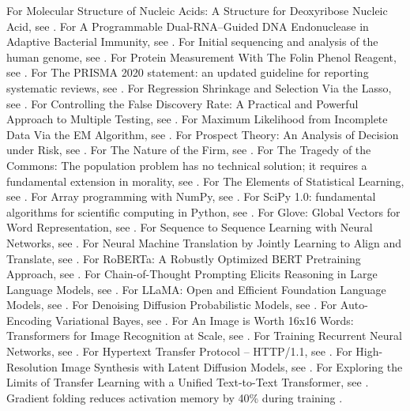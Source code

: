 \documentclass{article}
\begin{document}
For Molecular Structure of Nucleic Acids: A Structure for Deoxyribose Nucleic Acid, see \citet{watson1953molecular}.
For A Programmable Dual-RNA–Guided DNA Endonuclease in Adaptive Bacterial Immunity, see \citet{jinek2012programmable}.
For Initial sequencing and analysis of the human genome, see \citet{lander2001initial}.
For Protein Measurement With The Folin Phenol Reagent, see \citet{lowry1951protein}.
For The PRISMA 2020 statement: an updated guideline for reporting systematic reviews, see \citet{page2021prisma}.
For Regression Shrinkage and Selection Via the Lasso, see \citet{tibshirani1996regression}.
For Controlling the False Discovery Rate: A Practical and Powerful Approach to Multiple Testing, see \citet{benjamini1995controlling}.
For Maximum Likelihood from Incomplete Data Via the EM Algorithm, see \citet{dempster1977maximum}.
For Prospect Theory: An Analysis of Decision under Risk, see \citet{kahneman1979prospect}.
For The Nature of the Firm, see \citet{coase1937nature}.
For The Tragedy of the Commons: The population problem has no technical solution; it requires a fundamental extension in morality, see \citet{hardin1968tragedy}.
For The Elements of Statistical Learning, see \citet{hastie2009elements}.
For Array programming with NumPy, see \citet{harris2020array}.
For SciPy 1.0: fundamental algorithms for scientific computing in Python, see \citet{virtanen2020scipy}.
For Glove: Global Vectors for Word Representation, see \citet{pennington2014glove}.
For Sequence to Sequence Learning with Neural Networks, see \citet{sutskever2014sequence}.
For Neural Machine Translation by Jointly Learning to Align and Translate, see \citet{bahdanau2015neural}.
For RoBERTa: A Robustly Optimized BERT Pretraining Approach, see \citet{liu2019roberta}.
For Chain-of-Thought Prompting Elicits Reasoning in Large Language Models, see \citet{wei2022chain}.
For LLaMA: Open and Efficient Foundation Language Models, see \citet{touvron2023llama}.
For Denoising Diffusion Probabilistic Models, see \citet{ho2020denoising}.
For Auto-Encoding Variational Bayes, see \citet{kingma2014auto}.
For An Image is Worth 16x16 Words: Transformers for Image Recognition at Scale, see \citet{dosovitskiy2021image}.
For Training Recurrent Neural Networks, see \citet{sutskever2013training}.
For Hypertext Transfer Protocol -- HTTP/1.1, see \citet{fielding1999rfc2616}.
For High-Resolution Image Synthesis with Latent Diffusion Models, see \citet{rombach2022high}.
For Exploring the Limits of Transfer Learning with a Unified Text-to-Text Transformer, see \citet{raffel2020exploring}.
Gradient folding reduces activation memory by 40\% during training \citep{chen2023gradfold}.
\end{document}
